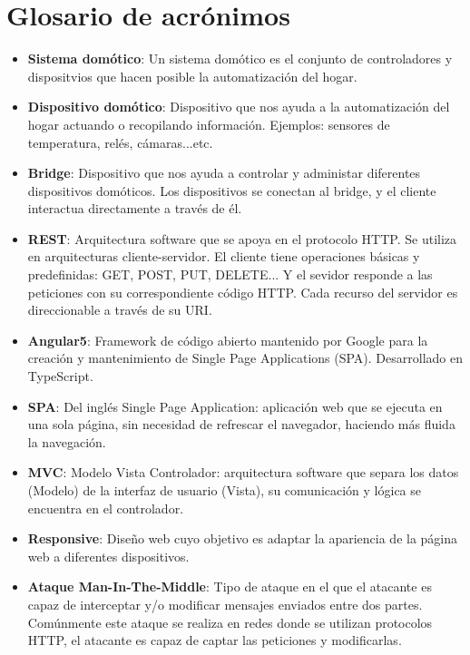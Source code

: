 \chapter*{Glosario de acrónimos}

\begin{itemize}
  
\item{\textbf{Sistema domótico}: Un sistema domótico es el conjunto de controladores y dispositvios que hacen posible la automatización del hogar.}
\item{\textbf{Dispositivo domótico}: Dispositivo que nos ayuda a la automatización del hogar actuando o recopilando información. Ejemplos: sensores de temperatura, relés, cámaras...etc. }
\item{\textbf{Bridge}: Dispositivo que nos ayuda a controlar y administar diferentes dispositivos domóticos. Los dispositivos se conectan al bridge, y el cliente interactua directamente a través de él. }
\item{\textbf{REST}: Arquitectura software que se apoya en el protocolo HTTP. Se utiliza en arquitecturas cliente-servidor. El cliente tiene operaciones básicas y predefinidas: GET, POST, PUT, DELETE... Y el sevidor responde a las peticiones con su correspondiente código HTTP.
Cada recurso del servidor es direccionable a través de su URI.}
\item{\textbf{Angular5}: Framework de código abierto mantenido por Google para la creación y mantenimiento de Single Page Applications (SPA). Desarrollado en TypeScript. }
\item{\textbf{SPA}: Del inglés Single Page Application: aplicación web que se ejecuta en una sola página, sin necesidad de refrescar el navegador, haciendo más fluida la navegación.}
\item{\textbf{MVC}: Modelo Vista Controlador: arquitectura software que separa los datos (Modelo) de la interfaz de usuario (Vista), su comunicación y lógica se encuentra en el controlador.}
\item{\textbf{Responsive}: Diseño web cuyo objetivo es adaptar la apariencia de la página web a diferentes dispositivos.}
\item{\textbf{Ataque Man-In-The-Middle}: Tipo de ataque en el que el atacante es capaz de interceptar y/o modificar mensajes enviados entre dos partes. 
Comúnmente este ataque se realiza en redes donde se utilizan protocolos HTTP, el atacante es capaz de captar las peticiones y modificarlas.}
\end{itemize}

\newpage \thispagestyle{empty} %


